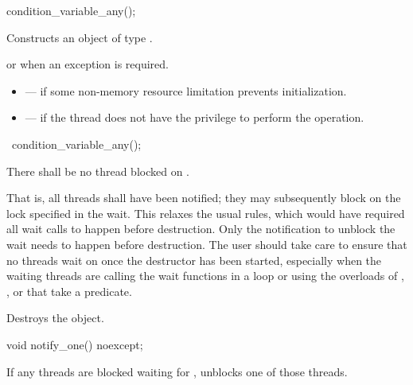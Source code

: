%
\begin{itemdecl}
condition_variable_any();
\end{itemdecl}

\begin{itemdescr}
\pnum
\effects Constructs an object of type .

\pnum
\throws {} or  when an exception is
required.

\pnum
\errors
\begin{itemize}
\item {} --- if some non-memory resource
limitation prevents initialization.

\item {} --- if the thread does not have the
privilege to perform the operation.
\end{itemize}
\end{itemdescr}

%
\begin{itemdecl}
~condition_variable_any();
\end{itemdecl}

\begin{itemdescr}
\pnum
\requires There shall be no thread blocked on . \begin{note} That is, all
threads shall have been notified; they may subsequently block on the lock specified in the
wait.
This relaxes the usual rules, which would have required all wait calls to happen before
destruction. Only the notification to unblock the wait needs to happen before destruction.
The user should take care to ensure that no threads wait on  once the destructor has
been started, especially when the waiting threads are calling the wait functions in a loop or
using the overloads of , , or  that take a predicate.
\end{note}

\pnum\effects Destroys the object.
\end{itemdescr}

%
\begin{itemdecl}
void notify_one() noexcept;
\end{itemdecl}

\begin{itemdescr}
\pnum\effects If any threads are blocked waiting for , unblocks one of those threads.
\end{itemdescr}

